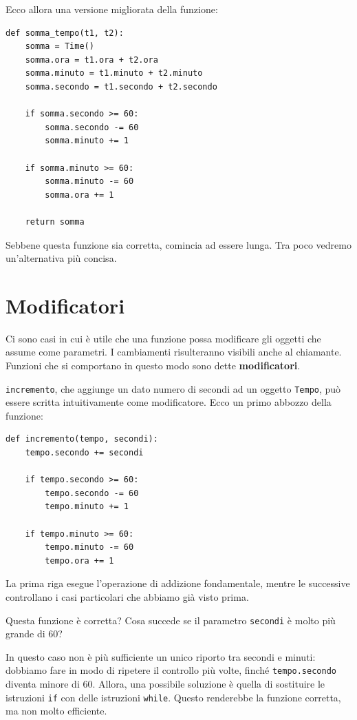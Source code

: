 \documentclass[10pt]{book}
\begin{document}
Ecco allora una versione migliorata della funzione:

\begin{verbatim}
def somma_tempo(t1, t2):
    somma = Time()
    somma.ora = t1.ora + t2.ora
    somma.minuto = t1.minuto + t2.minuto
    somma.secondo = t1.secondo + t2.secondo

    if somma.secondo >= 60:
        somma.secondo -= 60
        somma.minuto += 1

    if somma.minuto >= 60:
        somma.minuto -= 60
        somma.ora += 1

    return somma
\end{verbatim}
%
Sebbene questa funzione sia corretta, comincia ad essere lunga. Tra poco vedremo un'alternativa più concisa.


\section{Modificatori}
\label{increment}

Ci sono casi in cui è utile che una funzione possa modificare gli oggetti che assume come parametri. I cambiamenti risulteranno visibili anche al chiamante. Funzioni che si comportano in questo modo sono dette {\bf modificatori}.

{\tt incremento}, che aggiunge un dato numero di secondi ad un oggetto {\tt Tempo}, può essere scritta intuitivamente come modificatore. Ecco un primo abbozzo della funzione:

\begin{verbatim}
def incremento(tempo, secondi):
    tempo.secondo += secondi

    if tempo.secondo >= 60:
        tempo.secondo -= 60
        tempo.minuto += 1

    if tempo.minuto >= 60:
        tempo.minuto -= 60
        tempo.ora += 1
\end{verbatim}
%
La prima riga esegue l'operazione di addizione fondamentale, mentre le successive controllano i casi particolari che abbiamo già visto prima.

Questa funzione è corretta? Cosa succede se il parametro {\tt secondi}
è molto più grande di 60?  

In questo caso non è più sufficiente un unico riporto tra secondi e minuti: dobbiamo fare in modo di ripetere il controllo più volte, finché {\tt tempo.secondo} diventa minore di 60. Allora, una possibile soluzione è quella di sostituire le istruzioni {\tt if} con delle istruzioni {\tt while}.
Questo renderebbe la funzione corretta, ma non molto efficiente.
\end{document}
